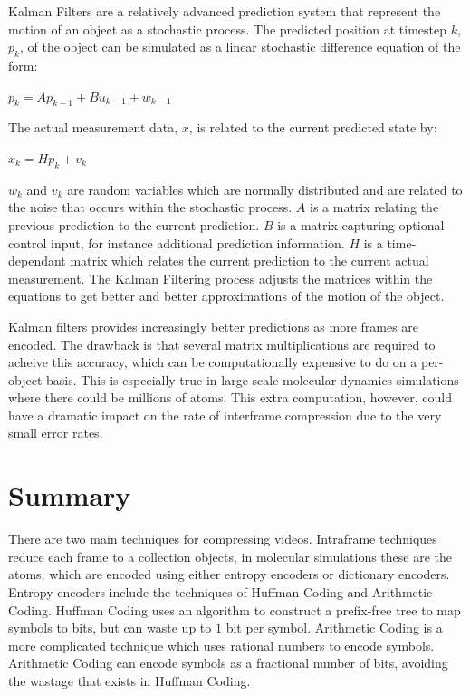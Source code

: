 \documentclass[a4paper,11pt]{report}
\begin{document}
Kalman Filters are a relatively advanced prediction system that represent the motion of an object as a stochastic process.\cite{welch1995ikf} The predicted position at timestep $k$, $p_k$, of the object can be simulated as a linear stochastic difference equation of the form:
\begin{center} $p_k = Ap_{k-1} + Bu_{k-1} + w_{k-1}$  \end{center}
The actual measurement data, $x$, is related to the current predicted state by:
\begin{center} $x_k = Hp_k + v_k$ \end{center}
$w_k$ and $v_k$ are random variables which are normally distributed and are related to the noise that occurs within the stochastic process. $A$ is a matrix relating the previous prediction to the current prediction. $B$ is a matrix capturing optional control input, for instance additional prediction information. $H$ is a time-dependant matrix which relates the current prediction to the current actual measurement. The Kalman Filtering process adjusts the matrices within the equations to get better and better approximations of the motion of the object.

Kalman filters provides increasingly better predictions as more frames are encoded. The drawback is that several matrix multiplications are required to acheive this accuracy, which can be computationally expensive to do on a per-object basis. This is especially true in large scale molecular dynamics simulations where there could be millions of atoms. This extra computation, however, could have a dramatic impact on the rate of interframe compression due to the very small error rates.

\section{Summary}

There are two main techniques for compressing videos. Intraframe techniques reduce each frame to a collection objects, in molecular simulations these are the atoms, which are encoded using either entropy encoders or dictionary encoders. Entropy encoders include the techniques of Huffman Coding and Arithmetic Coding. Huffman Coding uses an algorithm to construct a prefix-free tree to map symbols to bits, but can waste up to $1$ bit per symbol. Arithmetic Coding is a more complicated technique which uses rational numbers to encode symbols. Arithmetic Coding can encode symbols as a fractional number of bits, avoiding the wastage that exists in Huffman Coding.
\end{document}
